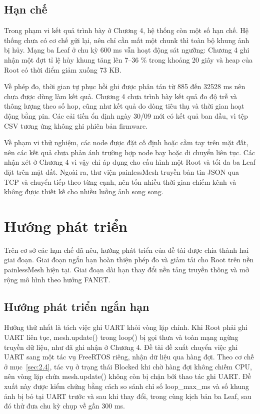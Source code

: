 \subsection{Hạn chế}

Trong phạm vi kết quả trình bày ở Chương 4, hệ thống còn một số hạn chế. Hệ thống chưa có cơ chế gửi lại, nên chỉ cần mất một chunk thì toàn bộ khung ảnh bị hủy. Mạng ba Leaf ở chu kỳ 600 ms vẫn hoạt động sát ngưỡng: Chương 4 ghi nhận một đợt tỉ lệ hủy khung tăng lên 7–36 \% trong khoảng 20 giây và heap của Root có thời điểm giảm xuống 73 KB.

Về phép đo, thời gian tự phục hồi ghi được phân tán từ 885 đến 32528 ms nên chưa được dùng làm kết quả. Chương 4 chưa trình bày kết quả đo độ trễ và thông lượng theo số hop, cũng như kết quả đo dòng tiêu thụ và thời gian hoạt động bằng pin. Các cải tiến ổn định ngày 30/09 mới có kết quả ban đầu, vì tệp CSV tương ứng không ghi phiên bản firmware.

Về phạm vi thử nghiệm, các node được đặt cố định hoặc cầm tay trên mặt đất, nên các kết quả chưa phản ánh trường hợp node bay hoặc di chuyển liên tục. Các nhận xét ở Chương 4 vì vậy chỉ áp dụng cho cấu hình một Root và tối đa ba Leaf đặt trên mặt đất. Ngoài ra, thư viện painlessMesh truyền bản tin JSON qua TCP và chuyển tiếp theo từng cạnh, nên tốn nhiều thời gian chiếm kênh và không được thiết kế cho nhiều luồng ảnh song song.


\section{Hướng phát triển}

Trên cơ sở các hạn chế đã nêu, hướng phát triển của đề tài được chia thành hai giai đoạn. Giai đoạn ngắn hạn hoàn thiện phép đo và giảm tải cho Root trên nền painlessMesh hiện tại. Giai đoạn dài hạn thay đổi nền tảng truyền thông và mở rộng mô hình theo hướng FANET.

\subsection{Hướng phát triển ngắn hạn}

Hướng thứ nhất là tách việc ghi UART khỏi vòng lặp chính. Khi Root phải ghi UART liên tục, mesh.update() trong loop() bị gọi thưa và toàn mạng ngừng truyền dữ liệu, như đã ghi nhận ở Chương 4. Đề tài đề xuất chuyển việc ghi UART sang một tác vụ FreeRTOS riêng, nhận dữ liệu qua hàng đợi. Theo cơ chế ở mục~\ref{sec:2.4}, tác vụ ở trạng thái Blocked khi chờ hàng đợi không chiếm CPU, nên vòng lặp chứa mesh.update() không còn bị chặn bởi thao tác ghi UART. Đề xuất này được kiểm chứng bằng cách so sánh chỉ số loop\_max\_ms và số khung ảnh bị bỏ tại UART trước và sau khi thay đổi, trong cùng kịch bản ba Leaf, sau đó thử đưa chu kỳ chụp về gần 300 ms.


